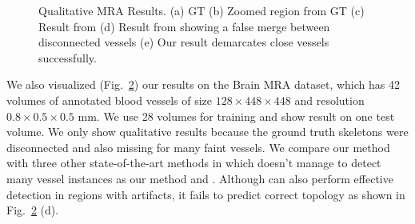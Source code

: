 \begin{figure}[t]
\begin{subfigure}[c]{0.18\textwidth}
		\caption{\label{fig:mri_qual_e}}
	\end{subfigure}
	\hfill\null
	\caption{Qualitative MRA Results. (a) GT (b) Zoomed region from GT (c) Result from \cite{sironi2015} (d) Result from \cite{cciccek20163d} showing a false merge between disconnected vessels (e) Our result demarcates close vessels successfully.}
	\label{fig:mri_qualitative}
\end{figure}

We also visualized (Fig.~\ref{fig:mri_qualitative}) our results on the Brain MRA dataset\cite{Bullitt2005}, which has 42 volumes of annotated blood vessels of size $128\times448\times448$ and resolution $0.8\times0.5\times0.5$ mm. We use 28 volumes for training and show result on one test volume. We only show qualitative results because the ground truth skeletons were disconnected and also missing for many faint vessels. We compare our method with three other state-of-the-art methods in which \cite{sironi2015} doesn't manage to detect many vessel instances as our method and \cite{cciccek20163d}. Although \cite{cciccek20163d} can also perform effective detection in regions with artifacts, it fails to predict correct topology as shown in Fig.~\ref{fig:mri_qualitative} (d).

